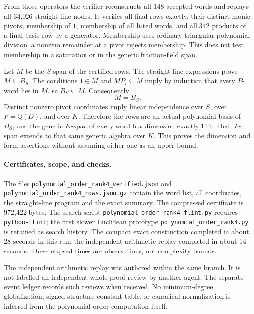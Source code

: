 From those operators the verifier reconstructs all 148
accepted words and replays all 34,026 straight-line nodes.
It verifies all final rows exactly, their distinct monic
pivots, membership of $1$, membership of all listed words,
and all 342 products of a final basis row by a generator.
Membership uses ordinary triangular polynomial division:
a nonzero remainder at a pivot rejects membership.  This
does not test membership in a saturation or in the generic
fraction-field span.

Let $M$ be the $S$-span of the certified rows.  The
straight-line expressions prove $M\subseteq B_S$.
The conditions $1\in M$ and $MP_i\subseteq M$ imply by
induction that every $P$-word lies in $M$, so $B_S\subseteq M$.
Consequently
\[
                         M=B_S.
 \tag{N-65}
\]
Distinct nonzero pivot coordinates imply linear independence
over $S$, over $F=\mathbb Q(D)$, and over $K$.  Therefore
the rows are an actual polynomial basis of $B_S$, and the
generic $K$-span of every word has dimension exactly 114.
Their $F$-span extends to that same generic algebra over $K$.
This proves the dimension and form assertions without
assuming either one as an upper bound.

\paragraph{Certificates, scope, and checks.}
The files
\nolinkurl{polynomial_order_rank4_verified.json} and
\nolinkurl{polynomial_order_rank4_rows.json.gz} contain the
word list, all coordinates, the straight-line program and
the exact summary.  The compressed certificate is 972,422
bytes.  The search script
\nolinkurl{polynomial_order_rank4_flint.py} requires
\texttt{python-flint}; the first slower Euclidean prototype
\nolinkurl{polynomial_order_rank4.py} is retained as search
history.  The compact exact construction completed in
about 28 seconds in this run; the independent arithmetic
replay completed in about 14 seconds.  These elapsed times
are observations, not complexity bounds.

The independent arithmetic replay was authored within the
same branch.  It is not labelled an independent whole-proof
review by another agent.  The separate event ledger records
such reviews when received.  No minimum-degree globalization,
signed structure-constant table, or canonical normalization
is inferred from the polynomial order computation itself.
